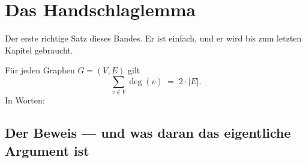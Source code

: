 \section{Das Handschlaglemma}

Der erste richtige Satz dieses Bandes. Er ist einfach, und er wird bis zum letzten Kapitel gebraucht.

\begin{merksatz}
Für jeden Graphen $G = (V,E)$ gilt
\[ \sum_{v \in V} \deg(v) \;=\; 2 \cdot |E| . \]
In Worten: 
\end{merksatz}

\subsection*{Der Beweis --- und was daran das eigentliche Argument ist}

